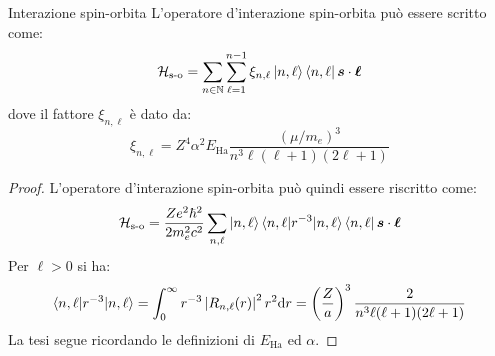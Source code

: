 \begin{proposition}{Interazione spin-orbita}{}
	L'operatore d'interazione spin-orbita può essere scritto come:
	\begin{equation}
		\mathcal{H}_\text{s-o} = \sum_{n \in \mathbb{N}} \sum_{\ell = 1}^{n - 1} \xi_{n,\ell} \ket{n,\ell} \bra{n,\ell} \boldsymbol{s} \cdot \boldsymbol{\ell}
	\end{equation}
	dove il fattore $ \xi_{n,\ell} $ è dato da:
	\begin{equation}
		\xi_{n,\ell} = Z^4 \alpha^2 E_\text{Ha} \frac{(\mu / m_e)^3}{n^3 \ell (\ell + 1) (2\ell + 1)}
		\label{eq:1-e-int-spin-orb}
	\end{equation}

	\tcblower

	\begin{proof}
		L'operatore d'interazione spin-orbita può quindi essere riscritto come:
		\begin{equation*}
			\mathcal{H}_\text{s-o} = \frac{Ze^2\hbar^2}{2m_e^2c^2} \sum_{n,\ell} \ket{n,\ell} \braket{n,\ell | r^{-3} | n,\ell} \bra{n,\ell} \boldsymbol{s} \cdot \boldsymbol{\ell}
		\end{equation*}
		Per $ \ell > 0 $ si ha:
		\begin{equation*}
			\braket{n,\ell | r^{-3} | n,\ell} = \int_0^\infty r^{-3} \left\lvert R_{n,\ell}(r)\right\rvert^2 r^2 \mathrm{d} r = \left( \frac{Z}{a} \right)^3 \frac{2}{n^3 \ell (\ell + 1) (2\ell + 1)}
		\end{equation*}
		La tesi segue ricordando le definizioni di $ E_\text{Ha} $ ed $ \alpha $.
	\end{proof}
\end{proposition}

